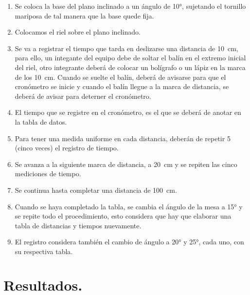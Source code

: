 \documentclass[14pt]{extarticle}
\begin{document}
\begin{enumerate}
\item Se coloca la base del plano inclinado a un ángulo de \ang{10}, sujetando el tornillo mariposa de tal manera que la base quede fija.
\item Colocamos el riel sobre el plano inclinado.
\item Se va a registrar el tiempo que tarda en deslizarse una distancia de \SI{10}{\centi\meter}, para ello, un integante del equipo debe de soltar el balín en el extremo inicial del riel, otro integrante deberá de colocar un bolígrafo o un lápiz en la marca de los \SI{10}{\centi\meter}. Cuando se suelte el balín, deberá de avisarse para que el cronómetro se inicie y cuando el balín llegue a la marca de distancia, se deberá de avisar para deterner el cronómetro.
\item El tiempo que se registre en el cronómetro, es el que se deberá de anotar en la tabla de datos.
\item Para tener una medida uniforme en cada distancia, deberán de repetir 5 (cinco veces) el registro de tiempo.
\item Se avanza a la siguiente marca de distancia, a \SI{20}{\centi\meter} y se repiten las cinco mediciones de tiempo.
\item Se continua hasta completar una distancia de \SI{100}{\centi\meter}.
\item Cuando se haya completado la tabla, se cambia el ángulo de la mesa a \ang{15} y se repite todo el procedimiento, esto considera que hay que elaborar una tabla de distancias y tiempos nuevamente.
\item El registro considera también el cambio de ángulo a \ang{20} y \ang{25}, cada uno, con su respectiva tabla.
\end{enumerate}

\section{Resultados.}
\end{document}
